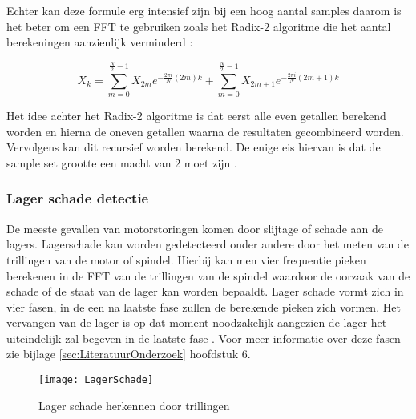Echter kan deze formule erg intensief zijn bij een hoog aantal samples daarom is het beter om een \gls{FFT} te gebruiken zoals het Radix-2 algoritme die het aantal berekeningen aanzienlijk verminderd \cite{web:FFT}:

\begin{equation}
	X_k = {\sum_{m=0}^{\frac{N}{2}-1}X_{2m}e^{-\frac{2\pi i}{N}(2m)k}} + {\sum_{m=0}^{\frac{N}{2}-1}X_{2m+1}e^{-\frac{2\pi i}{N}(2m+1)k}}
\end{equation}

Het idee achter het Radix-2 algoritme is dat eerst alle even getallen berekend worden en hierna de oneven getallen waarna de resultaten gecombineerd worden. Vervolgens kan dit recursief worden berekend. De enige eis hiervan is dat de sample set grootte een macht van 2 moet zijn \cite{web:Radix-2FFT}.

\subsubsection{Lager schade detectie}

De meeste gevallen van motorstoringen komen door slijtage of schade aan de lagers. Lagerschade kan worden gedetecteerd onder andere door het meten van de trillingen van de motor of spindel. Hierbij kan men vier frequentie pieken berekenen in de \gls{FFT} van de trillingen van de spindel waardoor de oorzaak van de schade of de staat van de lager kan worden bepaaldt. Lager schade vormt zich in vier fasen, in de een na laatste fase zullen de berekende pieken zich vormen. Het vervangen van de lager is op dat moment noodzakelijk aangezien de lager het uiteindelijk zal begeven in de laatste fase \cite{web:BearingFault}. Voor meer informatie over deze fasen zie bijlage \ref{sec:LiteratuurOnderzoek} hoofdstuk 6.


\begin{figure}[h]
	\centering
	\texttt{[image: LagerSchade]}
	\label{fig:LagerSchade}
	\caption{Lager schade herkennen door trillingen \cite{web:BearingFault}}
\end{figure}

